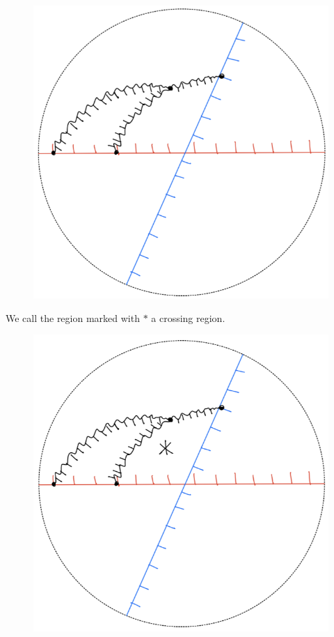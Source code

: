 \begin{definition}
\begin{enumerate}[label = (\roman*)]
\begin{itemize}
\begin{figure}[H]
    \includegraphics[scale = 0.55]{diagrams/local_systems_on_as_diagrams/4.png} 
    \caption{}
    \label{fig:your-label}
\end{figure}
We call the region marked with $*$ a crossing region.
\begin{figure}[H] 
    \centering
    \includegraphics[scale = 0.55]{diagrams/local_systems_on_as_diagrams/5.png} 
    \caption{}
    \label{fig:your-label}
\end{figure}


\end{itemize}
\end{enumerate}
\end{definition}
